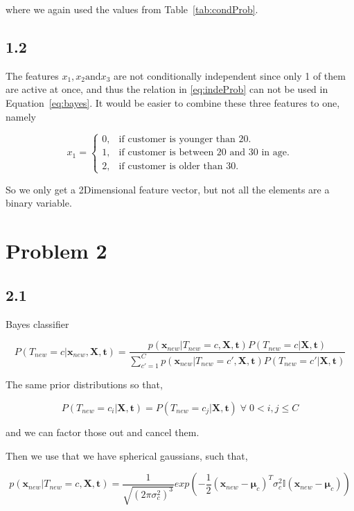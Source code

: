\documentclass[table,xcdraw]{article}
\begin{document}
where we again used the values from Table~\ref{tab:condProb}.



\subsection*{1.2}

The features $x_1,x_2 \text{and} x_3$ are not conditionally independent since only 1 of them are active at once, and thus the relation in \eqref{eq:indeProb} can not be used in Equation~\eqref{eq:bayes}. It would be easier to combine these three features to one, namely

\[
    x_1= 
\begin{cases}
    0, & \text{if customer is younger than 20.} \\
    1, & \text{if customer is between 20 and 30 in age.}\\
    2, & \text{if customer is older than 30.}
\end{cases}
\]

So we only get a 2Dimensional feature vector, but not all the elements are a binary variable.
 
\newpage 

\section*{Problem 2}
\subsection*{2.1}

Bayes classifier 

\begin{equation}
P(T_{new}=c|\bm{x}_{new},\bm{X},\bm{t})= \frac{p(\bm{x}_{new}|T_{new}=c,\bm{X},\bm{t})P(T_{new}=c|\bm{X},\bm{t})}{\sum_{c'=1}^{C}p(\bm{x}_{new}|T_{new}=c',\bm{X},\bm{t})P(T_{new}=c'|\bm{X},\bm{t})}
\end{equation}

The same prior distributions so that, 

\begin{equation}
P(T_{new}=c_i|\bm{X},\bm{t}) = P(T_{new}=c_j|\bm{X},\bm{t})\; \forall \; 0 < i,j \leq C
\end{equation}

and we can factor those out and cancel them.

Then we use that we have spherical gaussians, such that,

\begin{equation}
p(\bm{x}_{new}|T_{new}=c,\bm{X},\bm{t}) = \frac{1}{\sqrt{(2\pi\sigma_c^2)^3}}exp{\left(-\frac{1}{2}(\bm{x}_{new}-\bm{\mu}_c)^{T}\sigma_c^2 \mathbb{I} (\bm{x}_{new}-\bm{\mu}_c) \right)}
\end{equation}
\end{document}
